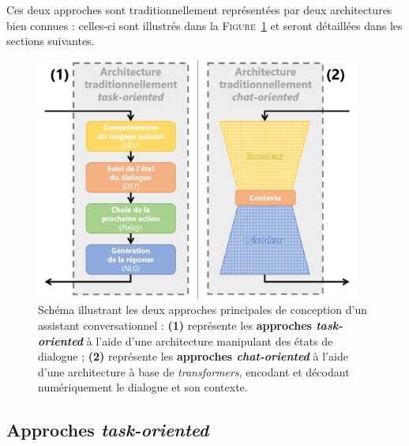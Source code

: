 		Ces deux approches sont traditionnellement représentées par deux architectures bien connues : celles-ci sont illustrés dans la \textsc{Figure~\ref{figure:B.2-ANNEXE-CHATBOT-APPROCHES}} et seront détaillées dans les sections suivantes.
		\begin{figure}[H]
			\centering
			\includegraphics[width=0.95\textwidth]{figures/annexe-chatbots-architectures}
			\caption{
				Schéma illustrant les deux approches principales de conception d'un assistant conversationnel :
				\textbf{(1)} représente les \textbf{approches \textit{task-oriented}} à l'aide d'une architecture manipulant des états de dialogue ;
				\textbf{(2)} représente les \textbf{approches \textit{chat-oriented}} à l'aide d'une architecture à base de \textit{transformers}, encodant et décodant numériquement le dialogue et son contexte.
			}
			\label{figure:B.2-ANNEXE-CHATBOT-APPROCHES}
		\end{figure}
		
		\newpage
		\subsection{Approches \textit{task-oriented}}
		\label{annex:B.1.1-CHATBOTS-APPROCHES-TASK-ORIENTED}
		
		

